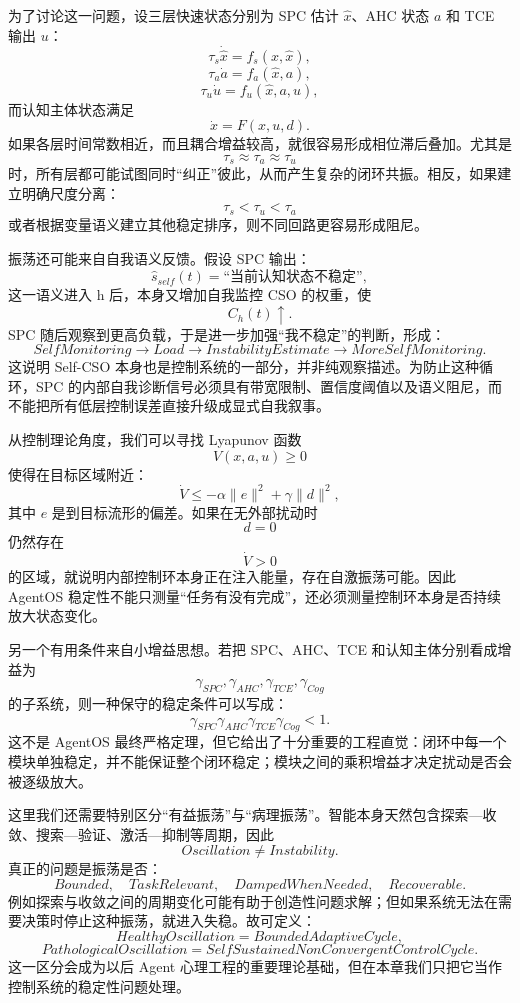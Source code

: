 为了讨论这一问题，设三层快速状态分别为 SPC 估计 $\hat{x}$、AHC 状态 $a$ 和 TCE 输出 $u$：
\[
\tau_s\dot{\hat{x}}
=
f_s(x,\hat{x}),
\]
\[
\tau_a\dot{a}
=
f_a(\hat{x},a),
\]
\[
\tau_u\dot{u}
=
f_u(\hat{x},a,u),
\]
而认知主体状态满足
\[
\dot{x}
=
F(x,u,d).
\]
如果各层时间常数相近，而且耦合增益较高，就很容易形成相位滞后叠加。尤其是
\[
\tau_s
\approx
\tau_a
\approx
\tau_u
\]
时，所有层都可能试图同时“纠正”彼此，从而产生复杂的闭环共振。相反，如果建立明确尺度分离：
\[
\tau_s
<
\tau_u
<
\tau_a
\]
或者根据变量语义建立其他稳定排序，则不同回路更容易形成阻尼。

振荡还可能来自自我语义反馈。假设 SPC 输出：
\[
\hat{s}_{self}(t)
=
\text{``当前认知状态不稳定''},
\]
这一语义进入 h 后，本身又增加自我监控 CSO 的权重，使
\[
C_h(t)\uparrow.
\]
SPC 随后观察到更高负载，于是进一步加强“我不稳定”的判断，形成：
\[
SelfMonitoring
\rightarrow
Load
\rightarrow
InstabilityEstimate
\rightarrow
MoreSelfMonitoring.
\]
这说明 Self-CSO 本身也是控制系统的一部分，并非纯观察描述。为防止这种循环，SPC 的内部自我诊断信号必须具有带宽限制、置信度阈值以及语义阻尼，而不能把所有低层控制误差直接升级成显式自我叙事。

从控制理论角度，我们可以寻找 Lyapunov 函数
\[
V(x,a,u)
\ge0
\]
使得在目标区域附近：
\[
\dot V
\le
-\alpha \|e\|^2
+
\gamma \|d\|^2,
\]
其中 $e$ 是到目标流形的偏差。如果在无外部扰动时
\[
d=0
\]
仍然存在
\[
\dot V>0
\]
的区域，就说明内部控制环本身正在注入能量，存在自激振荡可能。因此 AgentOS 稳定性不能只测量“任务有没有完成”，还必须测量控制环本身是否持续放大状态变化。

另一个有用条件来自小增益思想。若把 SPC、AHC、TCE 和认知主体分别看成增益为
\[
\gamma_{SPC},
\gamma_{AHC},
\gamma_{TCE},
\gamma_{Cog}
\]
的子系统，则一种保守的稳定条件可以写成：
\[
\gamma_{SPC}
\gamma_{AHC}
\gamma_{TCE}
\gamma_{Cog}
<1.
\]
这不是 AgentOS 最终严格定理，但它给出了十分重要的工程直觉：闭环中每一个模块单独稳定，并不能保证整个闭环稳定；模块之间的乘积增益才决定扰动是否会被逐级放大。

这里我们还需要特别区分“有益振荡”与“病理振荡”。智能本身天然包含探索—收敛、搜索—验证、激活—抑制等周期，因此
\[
Oscillation\neq Instability.
\]
真正的问题是振荡是否：
\[
Bounded,
\quad
TaskRelevant,
\quad
DampedWhenNeeded,
\quad
Recoverable.
\]
例如探索与收敛之间的周期变化可能有助于创造性问题求解；但如果系统无法在需要决策时停止这种振荡，就进入失稳。故可定义：
\[
\boxed{
HealthyOscillation
=
BoundedAdaptiveCycle,
}
\]
\[
\boxed{
PathologicalOscillation
=
SelfSustainedNonConvergentControlCycle.
}
\]
这一区分会成为以后 Agent 心理工程的重要理论基础，但在本章我们只把它当作控制系统的稳定性问题处理。

